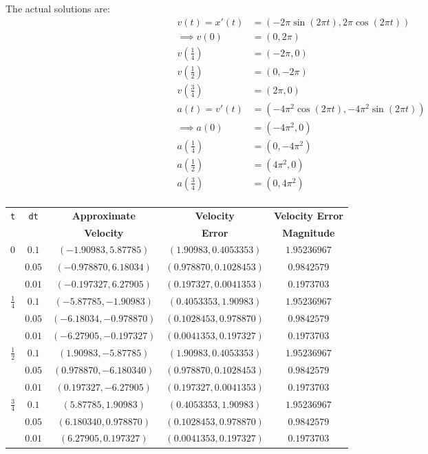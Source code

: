 \documentclass[12pt]{article}
\begin{document}
\noindent The actual solutions are:
\begin{align*}
    v(t) = x'(t) &= (-2\pi\sin(2\pi t), 2\pi\cos(2\pi t)) \\
    \implies v(0) &= (0, 2\pi) \\
    v(\textstyle\frac{1}{4}) &= (-2\pi, 0) \\
    v(\textstyle\frac{1}{2}) &= (0, -2\pi) \\
    v(\textstyle\frac{3}{4}) &= (2\pi, 0) \\
    a(t) = v'(t) &= (-4\pi^2\cos(2\pi t), -4\pi^2\sin(2\pi t)) \\
    \implies a(0) &= (-4\pi^2, 0) \\
    a(\textstyle\frac{1}{4}) &= (0, -4\pi^2) \\
    a(\textstyle\frac{1}{2}) &= (4\pi^2, 0) \\
    a(\textstyle\frac{3}{4}) &= (0, 4\pi^2) \\
\end{align*}
\begin{table}[H]
    \begin{tabular}{|||c|c|c|c|c|||} \hline \hline \hline
        {\tt t} & {\tt dt} & {\bf Approximate} & {\bf Velocity} & {\bf Velocity Error}\\
         & & {\bf Velocity} & {\bf Error} & {\bf Magnitude} \\ \hline \hline \hline
        $0$ & $0.1$ & $(-1.90983, 5.87785)$ & $(1.90983, 0.4053353)$ & $1.95236967$ \\ \hline
         & $0.05$ & $(-0.978870, 6.18034)$ & $(0.978870, 0.1028453)$ & $0.9842579$ \\ \hline
         & $0.01$ & $(-0.197327, 6.27905)$ & $(0.197327, 0.0041353)$ & $0.1973703$\\ \hline \hline
        $\frac{1}{4}$ & $0.1$ & $(-5.87785, -1.90983)$ & $(0.4053353, 1.90983)$ & $1.95236967$ \\ \hline
         & $0.05$ & $(-6.18034, -0.978870)$ & $(0.1028453, 0.978870)$ & $0.9842579$ \\ \hline
         & $0.01$ & $(-6.27905, -0.197327)$ & $(0.0041353, 0.197327)$ & $0.1973703$\\ \hline \hline
        $\frac{1}{2}$ & $0.1$ & $(1.90983, -5.87785)$ & $(1.90983, 0.4053353)$ & $1.95236967$ \\ \hline
         & $0.05$ & $(0.978870, -6.180340)$ & $(0.978870, 0.1028453)$ & $0.9842579$ \\ \hline
         & $0.01$ & $(0.197327, -6.27905)$ & $(0.197327, 0.0041353)$ & $0.1973703$\\ \hline \hline
        $\frac{3}{4}$ & $0.1$ & $(5.87785, 1.90983)$ & $(0.4053353, 1.90983)$ & $1.95236967$ \\ \hline
         & $0.05$ & $(6.180340, 0.978870)$ & $(0.1028453, 0.978870)$ & $0.9842579$ \\ \hline
         & $0.01$ & $(6.27905, 0.197327)$ & $(0.0041353, 0.197327)$ & $0.1973703$\\ \hline \hline \hline
    \end{tabular}
\end{table}
\end{document}
